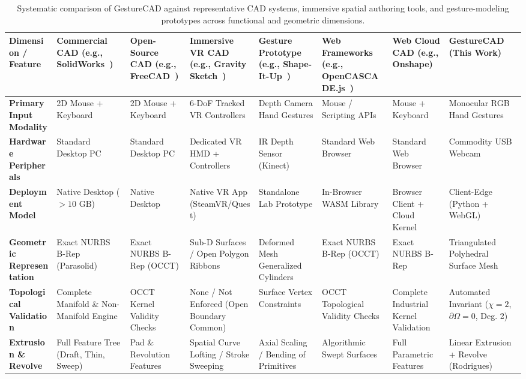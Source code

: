 \begin{table}[t]
\caption{Systematic comparison of GestureCAD against representative CAD systems, immersive spatial authoring tools, and gesture-modeling prototypes across functional and geometric dimensions.}
\label{tab:related_work}
\centering
\scriptsize
\begin{tabular}{p{2.5cm}p{1.8cm}p{1.8cm}p{1.8cm}p{2.2cm}p{2.2cm}p{2.0cm}p{1.8cm}}
\toprule
\textbf{Dimension / Feature} & \textbf{Commercial CAD} (e.g., SolidWorks~\cite{solidworks}) & \textbf{Open-Source CAD} (e.g., FreeCAD~\cite{freecad}) & \textbf{Immersive VR CAD} (e.g., Gravity Sketch~\cite{gravitysketch}) & \textbf{Gesture Prototype} (e.g., Shape-It-Up~\cite{vinayak2013shapeitup}) & \textbf{Web Frameworks} (e.g., OpenCASCADE.js~\cite{opencascadejs}) & \textbf{Web Cloud CAD} (e.g., Onshape) & \textbf{GestureCAD} (This Work) \\
\midrule
\textbf{Primary Input Modality} & 2D Mouse + Keyboard & 2D Mouse + Keyboard & 6-DoF Tracked VR Controllers & Depth Camera Hand Gestures & Mouse / Scripting APIs & Mouse + Keyboard & Monocular RGB Hand Gestures \\
\textbf{Hardware Peripherals} & Standard Desktop PC & Standard Desktop PC & Dedicated VR HMD + Controllers & IR Depth Sensor (Kinect) & Standard Web Browser & Standard Web Browser & Commodity USB Webcam \\
\textbf{Deployment Model} & Native Desktop ($>10\text{ GB}$) & Native Desktop & Native VR App (SteamVR/Quest) & Standalone Lab Prototype & In-Browser WASM Library & Browser Client + Cloud Kernel & Client-Edge (Python + WebGL) \\
\textbf{Geometric Representation} & Exact NURBS B-Rep (Parasolid) & Exact NURBS B-Rep (OCCT) & Sub-D Surfaces / Open Polygon Ribbons & Deformed Mesh Generalized Cylinders & Exact NURBS B-Rep (OCCT) & Exact NURBS B-Rep & Triangulated Polyhedral Surface Mesh \\
\textbf{Topological Validation} & Complete Manifold \& Non-Manifold Engine & OCCT Kernel Validity Checks & None / Not Enforced (Open Boundary Common) & Surface Vertex Constraints & OCCT Topological Validity Checks & Complete Industrial Kernel Validation & Automated Invariant ($\chi = 2$, $\partial \Omega = 0$, Deg. 2) \\
\textbf{Extrusion \& Revolve} & Full Feature Tree (Draft, Thin, Sweep) & Pad \& Revolution Features & Spatial Curve Lofting / Stroke Sweeping & Axial Scaling / Bending of Primitives & Algorithmic Swept Surfaces & Full Parametric Features & Linear Extrusion + Revolve (Rodrigues) \\

\end{tabular}
\end{table}
